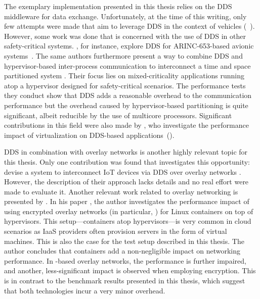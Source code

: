 The exemplary implementation presented in this thesis relies on the DDS middleware for data exchange. Unfortunately, at the time of this writing, only few attempts were made that aim to leverage DDS in the context of vehicles (\eg\ \cite{bouhouch2013dds, bouhouch2011implementation}). However, some work was done that is concerned with the use of DDS in other safety-critical systems. \citeauthor*{perez2017handling}, for instance, explore DDS for ARINC-653-based avionic systems~\cite{perez2017handling}.
The same authors furthermore present a way to combine DDS and hypervisor-based inter-process communication to interconnect a time and space partitioned system \cite{perez:gutierrez:ieeetpds16}. Their focus lies on mixed-criticality applications running atop a hypervisor designed for safety-critical scenarios. The performance tests they conduct show that DDS adds a reasonable overhead to the communication performance but the overhead caused by hypervisor-based partitioning is quite significant, albeit reducible by the use of multicore processors.
Significant contributions in this field were also made by \citeauthor*{serrano2013virtualizing}, who investigate the performance impact of virtualization on DDS-based applications~(\cite{serrano2013virtualizing, garcia2013benchmarking}).

DDS in combination with overlay networks is another highly relevant topic for this thesis. Only one contribution was found that investigates this opportunity:
\citeauthor*{hakiri2015publish} devise a system to interconnect IoT devices via DDS over overlay networks \cite{hakiri2015publish}. However, the description of their approach lacks details and no real effort were made to evaluate it.
Another relevant work related to overlay networking is presented by \citeauthor*{kratzke2017microservices}. In his paper \cite{kratzke2017microservices}, the author investigates the performance impact of using encrypted overlay networks (in particular, \wnet ) for Linux containers on top of hypervisors. This setup---containers atop hypervisors---is very common in cloud scenarios as IaaS providers often provision servers in the form of virtual machines. This is also the case for the test setup described in this thesis. The author concludes that containers add a non-negligible impact on networking performance. In \wnet -based overlay networks, the performance is further impaired, and another, less-significant impact is observed when employing encryption. This is in contrast to the benchmark results presented in this thesis, which suggest that both technologies incur a very minor overhead.

